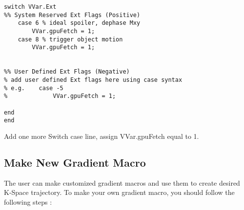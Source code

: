 \documentclass{book}%
\begin{document}
\begin{enumerate}
\begin{verbatim}
switch VVar.Ext
%% System Reserved Ext Flags (Positive)   
    case 6 % ideal spoiler, dephase Mxy
        VVar.gpuFetch = 1;
    case 8 % trigger object motion
        VVar.gpuFetch = 1;
				
				
%% User Defined Ext Flags (Negative)
% add user defined Ext flags here using case syntax
% e.g.    case -5
%             VVar.gpuFetch = 1;

end
end
\end{verbatim}

Add one more Switch case line, assign VVar.gpuFetch equal to 1. 

\end{enumerate}

\subsection{Make New Gradient Macro}

The user can make customized gradient macros and use them to create desired K-Space trajectory. To make your own gradient macro, you should follow the following steps :
\end{document}
